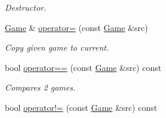 \begin{DoxyCompactItemize}
\begin{DoxyCompactList}\small\item\em Destructor. \item\end{DoxyCompactList}\item 
\hyperlink{classpgn_1_1Game}{Game} \& \hyperlink{classpgn_1_1Game_a0269e03dd3ec64fc52422e37a3eb5fc8}{operator=} (const \hyperlink{classpgn_1_1Game}{Game} \&src)
\begin{DoxyCompactList}\small\item\em Copy given game to current. \item\end{DoxyCompactList}\item 
bool \hyperlink{classpgn_1_1Game_a77fc6ee1f9df2cfe681cd3f5349ea406}{operator==} (const \hyperlink{classpgn_1_1Game}{Game} \&src) const 
\begin{DoxyCompactList}\small\item\em Compares 2 games. \item\end{DoxyCompactList}\item 
\hypertarget{classpgn_1_1Game_aa37c1fd209b5c52c715b9b741eb008bf}{
bool \hyperlink{classpgn_1_1Game_aa37c1fd209b5c52c715b9b741eb008bf}{operator!=} (const \hyperlink{classpgn_1_1Game}{Game} \&src) const }
\label{classpgn_1_1Game_aa37c1fd209b5c52c715b9b741eb008bf}


\end{DoxyCompactItemize}
